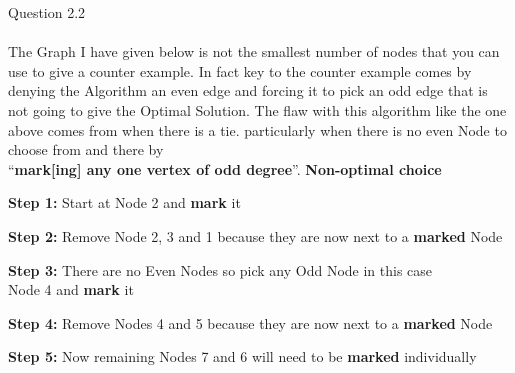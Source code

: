 \documentclass[10pt]{article}
\begin{document}
\pagebreak
\hfill \break
\break
Question 2.2
\\
\\
The Graph I have given below is not the smallest number of nodes that you can use to give a counter example. In fact key to the counter example comes by denying the Algorithm an even edge and forcing it to pick an odd edge that is not going to give the Optimal Solution. The flaw with this algorithm like the one above comes from when there is a tie. particularly when there is no even Node to choose from and there by  \\\enquote{\textbf{mark[ing] any one vertex of odd degree}}.
\hfill \break
\break
\textbf{Non-optimal choice}
\begin{steps}
  \item \textbf{Step 1:} Start at Node 2 and \textbf{mark} it
  \item \textbf{Step 2:} Remove Node 2, 3 and 1 because they are now next to a \textbf{marked} Node
  \item \textbf{Step 3:} There are no Even Nodes so pick any Odd Node in this case\\ Node 4 and \textbf{mark} it
  \item \textbf{Step 4:} Remove Nodes 4 and 5 because they are now next to a \textbf{marked} Node
  \item \textbf{Step 5:} Now remaining Nodes 7 and 6 will need to be \textbf{marked} individually 
\end{steps}
\hfill \break
\end{document}
